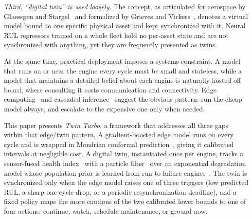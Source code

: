 \emph{Third, ``digital twin'' is used loosely.} The concept, as articulated for
aerospace by Glaessgen and Stargel~\cite{glaessgen2012digital} and formalized
by Grieves and Vickers~\cite{grieves2017digital}, denotes a virtual model bound
to one specific physical asset and kept synchronized with it. Neural RUL
regressors trained on a whole fleet hold no per-asset state and are not
synchronized with anything, yet they are frequently presented as twins.

At the same time, practical deployment imposes a systems constraint. A model
that runs on or near the engine every cycle must be small and stateless, while
a model that maintains a detailed belief about each engine is naturally hosted
off board, where consulting it costs communication and connectivity. Edge
computing~\cite{shi2016edge} and cascaded inference~\cite{teerapittayanon2016branchynet}
suggest the obvious pattern: run the cheap model always, and escalate to the
expensive one only when needed.

This paper presents \emph{Twin Turbo}, a framework that addresses all three
gaps within that edge/twin pattern. A gradient-boosted edge model runs on every
cycle and is wrapped in Mondrian conformal prediction~\cite{vovk2005alrw,angelopoulos2021gentle},
giving it calibrated intervals at negligible cost. A digital twin, instantiated
once per engine, tracks a sensor-fused health index~\cite{wang2008similarity}
with a particle filter~\cite{arulampalam2002tutorial,orchard2009particle} over
an exponential degradation model whose population prior is learned from
run-to-failure engines~\cite{gebraeel2005residual}. The twin is synchronized
only when the edge model raises one of three triggers (low predicted RUL, a
sharp one-cycle drop, or a periodic resynchronization deadline), and a fixed
policy maps the more cautious of the two calibrated lower bounds to one of four
actions: continue, watch, schedule maintenance, or ground now.

